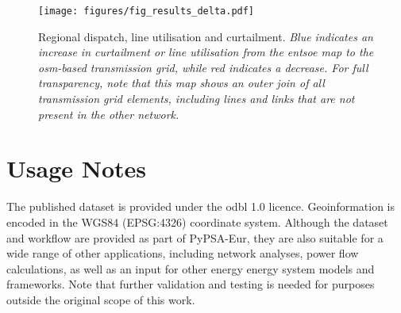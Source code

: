 \documentclass[fleqn,10pt]{wlscirep}
\providecommand{\DIFaddbegin}{} %
\providecommand{\DIFaddend}{} %
\providecommand{\DIFdelbegin}{} %
\providecommand{\DIFdelend}{} %
\begin{document}
\newpage
\begin{figure}[!htbp]
    \centering
    \texttt{[image: figures/fig\_results\_delta.pdf]}
    \caption{Regional dispatch, line utilisation and curtailment. \textit{Blue indicates an increase in curtailment or line utilisation from the \acrshort{entsoe} map to the \gls{osm}-based transmission grid, while red indicates a decrease. For full transparency, note that this map shows an outer join of all transmission grid elements, including lines and links that are not present in the other network.}}
    \label{fig:results_delta}
\end{figure}

\newpage

\section*{Usage Notes}
\DIFdelbegin %


\DIFdelend \DIFaddbegin {}
\DIFaddend The published dataset is provided under the \gls{odbl} 1.0 licence. Geoinformation is encoded in the WGS84 (EPSG:4326) coordinate system. Although the dataset and workflow are provided as part of PyPSA-Eur, they are also suitable for a wide range of other applications, including network analyses, power flow calculations, as well as an input for other energy energy system models and frameworks. Note that further validation and testing is needed for purposes outside the original scope of this work. 
\end{document}
